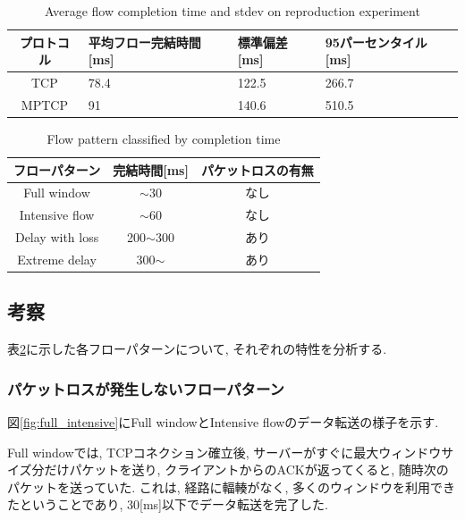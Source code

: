 \documentclass[10pt, a4paper, twocolumn]{jsarticle}
\begin{document}
\begin{table}[h]
\begin{center}
\footnotesize
\begin{tabular}{c|p{5em}|p{4em}|p{5em}}
\hline
プロトコル & 平均フロー完結時間[ms]& 標準偏差[ms] &
95パーセンタイル[ms]\\
\hline \hline TCP &\hfil 78.4 &\hfil 122.5 &\hfil 266.7\\
MPTCP &\hfil 91 &\hfil 140.6 &\hfil 510.5\\
\hline
\end{tabular}
\caption{Average flow completion time and stdev on reproduction experiment}
\label{table:short_flow_rep}
\end{center}
\end{table}

\begin{table}[h]
\begin{center}
\footnotesize
\begin{tabular}{c|c|c}
\hline
フローパターン & 完結時間[ms] & パケットロスの有無 \\ \hline \hline
Full window & $\sim$30 & なし\\
Intensive flow & $\sim$60 & なし\\
Delay with loss & 200$\sim$300 & あり\\
Extreme delay & 300$\sim$ & あり\\
\hline
\end{tabular}
\caption{Flow pattern classified by completion time}
\label{table:flow_pattern}
\end{center}
\end{table}

\subsection{考察}
表\ref{table:flow_pattern}に示した各フローパターンについて, それぞれの特性を分析する.

\subsubsection{パケットロスが発生しないフローパターン}
図\ref{fig:full_intensive}にFull windowとIntensive flowのデータ転送の様子を示す.

Full windowでは, TCPコネクション確立後, サーバーがすぐに最大ウィンドウサイズ分だけパケットを送り,
クライアントからのACKが返ってくると, 随時次のパケットを送っていた.
これは, 経路に輻輳がなく, 多くのウィンドウを利用できたということであり, 30[ms]以下でデータ転送を完了した.
\end{document}

